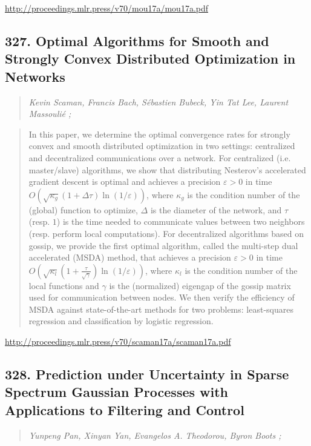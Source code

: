 \documentclass{article}
\begin{document}
\href{http://proceedings.mlr.press/v70/mou17a/mou17a.pdf}{http://proceedings.mlr.press/v70/mou17a/mou17a.pdf}

\subsection{327. Optimal Algorithms for Smooth and Strongly Convex Distributed Optimization in Networks}

\begin{quote}
\footnotesize{\textit{Kevin Scaman, Francis Bach, Sébastien Bubeck, Yin Tat Lee, Laurent Massoulié ;}}
\end{quote}

\begin{quote}
    In this paper, we determine the optimal convergence rates for strongly convex and smooth distributed optimization in two settings: centralized and decentralized communications over a network. For centralized (i.e. master/slave) algorithms, we show that distributing Nesterov’s accelerated gradient descent is optimal and achieves a precision $\varepsilon > 0$ in time $O(\sqrt{\kappa_g}(1+\Delta\tau)\ln(1/\varepsilon))$, where $\kappa_g$ is the condition number of the (global) function to optimize, $\Delta$ is the diameter of the network, and $\tau$ (resp. $1$) is the time needed to communicate values between two neighbors (resp. perform local computations). For decentralized algorithms based on gossip, we provide the first optimal algorithm, called the multi-step dual accelerated (MSDA) method, that achieves a precision $\varepsilon > 0$ in time $O(\sqrt{\kappa_l}(1+\frac{\tau}{\sqrt{\gamma}})\ln(1/\varepsilon))$, where $\kappa_l$ is the condition number of the local functions and $\gamma$ is the (normalized) eigengap of the gossip matrix used for communication between nodes. We then verify the efficiency of MSDA against state-of-the-art methods for two problems: least-squares regression and classification by logistic regression.  \end{quote}

\href{http://proceedings.mlr.press/v70/scaman17a/scaman17a.pdf}{http://proceedings.mlr.press/v70/scaman17a/scaman17a.pdf}

\subsection{328. Prediction under Uncertainty in Sparse Spectrum Gaussian Processes with Applications to Filtering and Control}

\begin{quote}
\footnotesize{\textit{Yunpeng Pan, Xinyan Yan, Evangelos A. Theodorou, Byron Boots ;}}
\end{quote}
\end{document}

